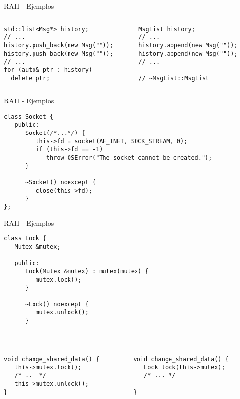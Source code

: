 \begin{frame}[fragile]{RAII - Ejemplos}
   \begin{columns}
      \begin{column}{.5\linewidth}
        \begin{lstlisting}[style=normal]
std::list<Msg*> history;
// ...
history.push_back(new Msg(""));
history.push_back(new Msg(""));
// ...
for (auto& ptr : history)
  delete ptr;
        \end{lstlisting}
      \end{column}
      \begin{column}{.4\linewidth}
         \begin{lstlisting}[style=normal]
MsgList history;
// ...
history.append(new Msg(""));
history.append(new Msg(""));
// ...

// ~MsgList::MsgList
        \end{lstlisting}
      \end{column}
   \end{columns}
\end{frame}

\begin{frame}[fragile]{RAII - Ejemplos}
   \begin{lstlisting}[style=normal]
class Socket {
   public:
      Socket(/*...*/) {
         this->fd = socket(AF_INET, SOCK_STREAM, 0);
         if (this->fd == -1)
            throw OSError("The socket cannot be created.");
      }

      ~Socket() noexcept {
         close(this->fd);
      }
};
   \end{lstlisting}
\end{frame}

\begin{frame}[fragile]{RAII - Ejemplos}
   \begin{lstlisting}[style=normal]
class Lock {
   Mutex &mutex;

   public:
      Lock(Mutex &mutex) : mutex(mutex) {
         mutex.lock();
      }

      ~Lock() noexcept {
         mutex.unlock();
      }
   \end{lstlisting}
~%
   \begin{columns}
      \begin{column}{.5\linewidth}
         \begin{lstlisting}[style=normal]
void change_shared_data() {
   this->mutex.lock();
   /* ... */
   this->mutex.unlock();
}
         \end{lstlisting}
      \end{column}
      \begin{column}{.4\linewidth}
         \begin{lstlisting}[style=normal]
void change_shared_data() {
   Lock lock(this->mutex);
   /* ... */

}
         \end{lstlisting}
      \end{column}
   \end{columns}
~%
\end{frame}


